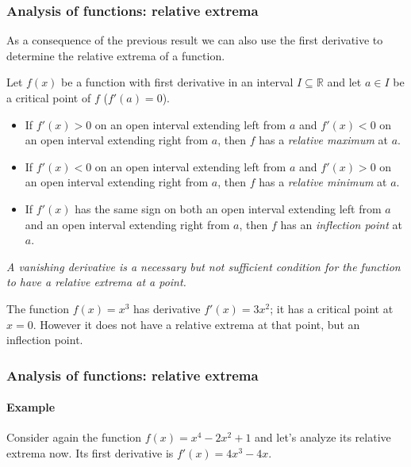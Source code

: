 \begin{frame}
	\frametitle{Analysis of functions: relative extrema}
	As a consequence of the previous result we can also use the first derivative to determine the relative extrema of a function. 
	\begin{theorem}
		Let $f(x)$ be a function with first derivative in an interval $I\subseteq \mathbb{R}$ and let $a\in I$ be a critical point of $f$ ($f'(a)=0$).
		\begin{itemize}
			\item  If $f'(x)>0$ on an open interval extending left from $a$ and $f'(x)<0$ on an open interval extending right from $a$, then $f$ has a \emph{relative maximum} at $a$.
			\item  If $f'(x)<0$ on an open interval extending left from $a$ and $f'(x)>0$ on an open interval extending right from $a$, then $f$ has a \emph{relative minimum} at $a$.
			\item If $f'(x)$ has the same sign on both an open interval extending left from $a$ and an open interval extending right from $a$, then $f$ has an \emph{inflection point} at $a$.
		\end{itemize}
	\end{theorem}
	
	 \emph{A vanishing derivative is a necessary but not sufficient condition for the function to have a relative extrema at a point.}
	
	 The function $f(x)=x^3$ has derivative $f'(x)=3x^2$; it has a critical point at $x=0$.
	However it does not have a relative extrema at that point, but an inflection point.
\end{frame}


\begin{frame}
	\frametitle{Analysis of functions: relative extrema}
	\framesubtitle{Example}
	Consider again the function $f(x)=x^4-2x^2+1$ and let's analyze its relative extrema now. 
	Its first derivative is $f'(x)=4x^3-4x$.
	\begin{center}
		\scalebox{0.9}{}
	\end{center}
\end{frame}


